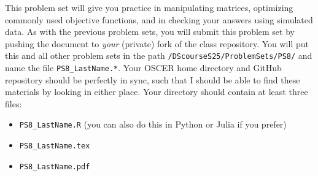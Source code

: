 \documentclass[12pt,english]{exam}
\begin{document}
This problem set will give you practice in manipulating matrices, optimizing commonly used objective functions, and in checking your answers using simulated data.
As with the previous problem sets, you will submit this problem set by pushing the document to \emph{your} (private) fork of the class repository. You will put this and all other problem sets in the path \texttt{/DScourseS25/ProblemSets/PS8/} and name the file \texttt{PS8\_LastName.*}. Your OSCER home directory and GitHub repository should be perfectly in sync, such that I should be able to find these materials by looking in either place. Your directory should contain at least three files:
\begin{itemize}
    \item \texttt{PS8\_LastName.R} (you can also do this in Python or Julia if you prefer)
    \item \texttt{PS8\_LastName.tex}
    \item \texttt{PS8\_LastName.pdf}
\end{itemize}
\end{document}
